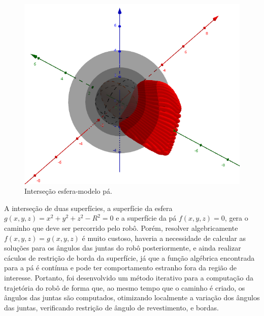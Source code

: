 \begin{figure}[!ht]
	\centering
	\includegraphics[width=\columnwidth]{figs/planejamento/intersecao_geogebra.png}
	\caption{Interseção esfera-modelo pá.}
	\label{fig::intergeo}
\end{figure}

A interseção de duas superfícies, a superfície da esfera
$g(x,y,z)=x^2+y^2+z^2-R^2=0$ e a superfície da pá $f(x,y,z)=0$, gera o caminho
que deve ser percorrido pelo robô. Porém, resolver algebricamente
$f(x,y,z)=g(x,y,z)$ é muito custoso, haveria a necessidade de
calcular as soluções para os ângulos das juntas do robô posteriormente, e ainda
realizar cáculos de restrição de borda da superfície, já que a função algébrica
encontrada para a pá é contínua e pode ter comportamento estranho fora da
região de interesse. Portanto, foi desenvolvido um método iterativo para a
computação da trajetória do robô de forma que, ao mesmo tempo que o caminho é
criado, os ângulos das juntas são computados, otimizando localmente a variação
dos ângulos das juntas, verificando restrição de ângulo de revestimento, e
bordas.

